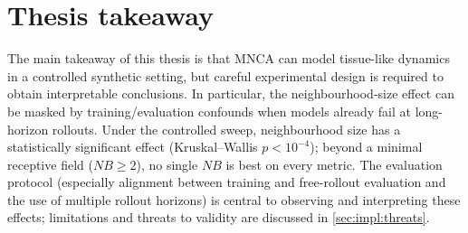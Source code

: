 \section{Thesis takeaway}
\label{sec:results:takeaway}

The main takeaway of this thesis is that MNCA can model tissue-like dynamics in a controlled synthetic setting, but careful experimental design is required to obtain interpretable conclusions.
In particular, the neighbourhood-size effect can be masked by training/evaluation confounds when models already fail at long-horizon rollouts.
Under the controlled sweep, neighbourhood size has a statistically significant effect (Kruskal--Wallis \(p < 10^{-4}\)); beyond a minimal receptive field (\(NB \ge 2\)), no single \(NB\) is best on every metric.
The evaluation protocol (especially alignment between training and free-rollout evaluation and the use of multiple rollout horizons) is central to observing and interpreting these effects; limitations and threats to validity are discussed in \cref{sec:impl:threats}.
